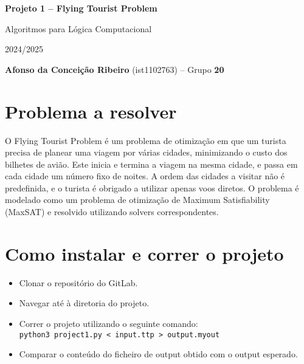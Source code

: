 \documentclass[12pt,a4paper]{article}
\newcommand{\reporttitle}{Projeto 1 -- Flying Tourist Problem}
\newcommand{\authorname}{Afonso da Conceição Ribeiro}
\newcommand{\authorgroup}{20}
\newcommand{\authorid}{ist1102763}
\newcommand{\reportauthor}{\textbf{\authorname} (\authorid) -- Grupo \textbf{\authorgroup}}
\newcommand{\reportsubject}{Algoritmos para Lógica Computacional}
\newcommand{\reportyear}{2024/2025}
\begin{document}
    \begin{titlepage}
        \centering
        \vspace*{5cm}
        {\Huge \textbf{\reporttitle} \par}

        \vspace{0.5cm}
        {\LARGE \reportsubject \par}

        \vspace{0.5cm}
        {\large \reportyear \par}

        \vspace{2cm}
        {\large \reportauthor \par}
        
        \vfill
        \renewcommand{\contentsname}{Índice}
        \tableofcontents

        \thispagestyle{empty}
        \clearpage
        
    \end{titlepage}


    \setcounter{page}{2}
    \setlength{\parskip}{0em}


    \section{Problema a resolver}
        O Flying Tourist Problem é um problema de otimização em que um turista precisa de planear uma viagem por várias cidades, minimizando o custo dos bilhetes de avião. Este inicia e termina a viagem na mesma cidade, e passa em cada cidade um número fixo de noites. A ordem das cidades a visitar não é predefinida, e o turista é obrigado a utilizar apenas voos diretos. O problema é modelado como um problema de otimização de Maximum Satisfiability (MaxSAT) e resolvido utilizando solvers correspondentes.

    \section{Como instalar e correr o projeto}
        \begin{itemize}
            \item Clonar o repositório do GitLab.
            \item Navegar até à diretoria do projeto.
            \item Correr o projeto utilizando o seguinte comando: \\
                  \texttt{python3 project1.py < input.ttp > output.myout}
            \item Comparar o conteúdo do ficheiro de output obtido com o output esperado.
        \end{itemize}
\end{document}
